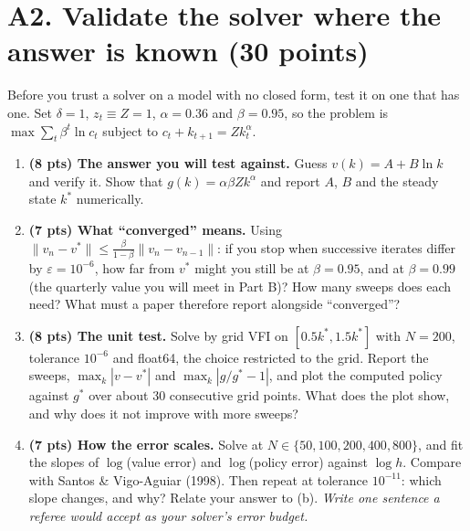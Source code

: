 \documentclass[11pt]{article}
\newif\ifsolutions \solutionsfalse
\newcommand{\solution}[1]{\ifsolutions\medskip
  {\color{blue!45!black}\textbf{Solution.} #1}\medskip\fi}
\begin{document}
\section*{A2. Validate the solver where the answer is known (30 points)}

Before you trust a solver on a model with no closed form, test it on one that has one. Set
$\delta=1$, $z_t\equiv Z=1$, $\alpha=0.36$ and $\beta=0.95$, so the problem is
$\max\sum_t\beta^t\ln c_t$ subject to $c_t+k_{t+1}=Zk_t^{\alpha}$.

\begin{enumerate}[label=(\alph*), leftmargin=*]

\item \textbf{(8 pts) The answer you will test against.} Guess $v(k)=A+B\ln k$ and verify it. Show
that $g(k)=\alpha\beta Zk^{\alpha}$ and report $A$, $B$ and the steady state $k^*$ numerically.

\solution{\keyAfive}

\item \textbf{(7 pts) What ``converged'' means.} Using
$\lVert v_n-v^*\rVert\le\frac{\beta}{1-\beta}\lVert v_n-v_{n-1}\rVert$: if you stop when successive
iterates differ by $\varepsilon=10^{-6}$, how far from $v^*$ might you still be at $\beta=0.95$, and
at $\beta=0.99$ (the quarterly value you will meet in Part B)? How many sweeps does each need? What
must a paper therefore report alongside ``converged''?

\solution{\keyAsix}

\item \textbf{(8 pts) The unit test.} Solve by grid VFI on $[0.5k^*,1.5k^*]$ with $N=200$, tolerance
$10^{-6}$ and float64, the choice restricted to the grid. Report the sweeps, $\max_k|v-v^*|$ and
$\max_k|g/g^*-1|$, and plot the computed policy against $g^*$ over about 30 consecutive grid points.
What does the plot show, and why does it not improve with more sweeps?

\solution{\keyAseven}

\item \textbf{(7 pts) How the error scales.} Solve at $N\in\{50,100,200,400,800\}$, and fit the slopes of
$\log$(value error) and $\log$(policy error) against $\log h$. Compare with Santos \&
Vigo-Aguiar (1998). Then repeat at tolerance $10^{-11}$: which slope changes, and why? Relate your
answer to (b). \emph{Write one sentence a referee would accept as your solver's error budget.}

\solution{\keyAeight}

\end{enumerate}
\end{document}
